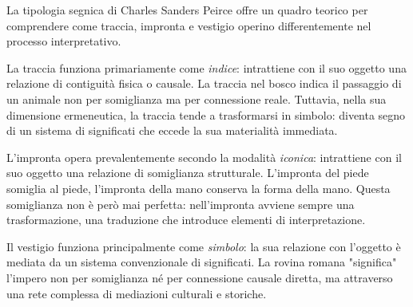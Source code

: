 \documentclass{../../lib/gs}
\begin{document}
%
%

%

La tipologia segnica di Charles Sanders Peirce \cite{peirce1931} offre un quadro teorico per comprendere come traccia, impronta e vestigio operino differentemente nel processo interpretativo.

La traccia funziona primariamente come \textit{indice}: intrattiene con il suo oggetto una relazione di contiguità fisica o causale. La traccia nel bosco indica il passaggio di un animale non per somiglianza ma per connessione reale. Tuttavia, nella sua dimensione ermeneutica, la traccia tende a trasformarsi in simbolo: diventa segno di un sistema di significati che eccede la sua materialità immediata.

L'impronta opera prevalentemente secondo la modalità \textit{iconica}: intrattiene con il suo oggetto una relazione di somiglianza strutturale. L'impronta del piede somiglia al piede, l'impronta della mano conserva la forma della mano. Questa somiglianza non è però mai perfetta: nell'impronta avviene sempre una trasformazione, una traduzione che introduce elementi di interpretazione.

Il vestigio funziona principalmente come \textit{simbolo}: la sua relazione con l'oggetto è mediata da un sistema convenzionale di significati. La rovina romana "significa" l'impero non per somiglianza né per connessione causale diretta, ma attraverso una rete complessa di mediazioni culturali e storiche.
\end{document}
